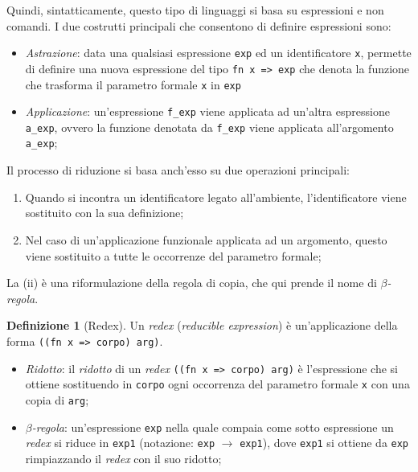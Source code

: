 \documentclass[12pt, a4paper]{report}
\theoremstyle{definition}
\newtheorem{definition}{Definizione}[section]
\newcommand{\code}[1]{\texttt{#1}}
\begin{document}
Quindi, sintatticamente, questo tipo di linguaggi si basa su espressioni e non
comandi. I due costrutti principali che consentono di definire espressioni sono:
\begin{itemize}
    \item \emph{Astrazione}: data una qualsiasi espressione \code{exp} ed un
    identificatore \code{x}, permette di definire una nuova espressione del tipo
    \code{fn x => exp} che denota la funzione che trasforma il parametro formale
    \code{x} in \code{exp}
    \item \emph{Applicazione}: un'espressione \code{f\_exp} viene applicata ad
    un'altra espressione \code{a\_exp}, ovvero la funzione denotata da \code{f\_exp}
    viene applicata all'argomento \code{a\_exp};
\end{itemize}

Il processo di riduzione si basa anch'esso su due operazioni principali:
\begin{enumerate}[label=(\roman*)]
    \item Quando si incontra un identificatore legato all'ambiente, l'identificatore
    viene sostituito con la sua definizione;
    \item Nel caso di un'applicazione funzionale applicata ad un argomento, questo
    viene sostituito a tutte le occorrenze del parametro formale;
\end{enumerate}

La (ii) è una riformulazione della regola di copia, che qui prende il nome di
$\beta$\emph{-regola}.

\begin{definition}[Redex]
    Un \emph{redex} (\emph{reducible expression}) è un'applicazione della forma
    \code{((fn x => corpo) arg)}.
    \begin{itemize}
        \item \emph{Ridotto}: il \emph{ridotto} di un \emph{redex}
        \code{((fn x => corpo) arg)} è l'espressione che si ottiene sostituendo
        in \code{corpo} ogni occorrenza del parametro formale \code{x} con una
        copia di \code{arg};
        \item $\beta$\emph{-regola}: un'espressione \code{exp} nella quale compaia
        come sotto espressione un \emph{redex} si riduce in \code{exp1}
        (notazione: \code{exp} $\rightarrow$ \code{exp1}), dove \code{exp1} si
        ottiene da \code{exp} rimpiazzando il \emph{redex} con il suo ridotto;
    \end{itemize}
\end{definition}
\end{document}
